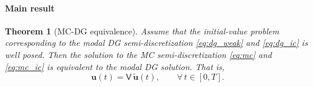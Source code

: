 \documentclass[pdflatex,sn-mathphys-num]{sn-jnl}%
\theoremstyle{thmstyleone}%
\newtheorem{theorem}{Theorem}%
\theoremstyle{thmstyletwo}%
\theoremstyle{thmstylethree}%
\newcommand{\mat}[1]{\ensuremath{\mathsf{#1}}}
\begin{document}
\paragraph{Main result}

\begin{theorem}[MC-DG equivalence]\label{thm:equivalence}
Assume that the initial-value problem corresponding to the modal DG semi-discretization \eqref{eq:dg_weak} and \eqref{eq:dg_ic} is well posed.  Then the solution to the MC semi-discretization \eqref{eq:mc} and \eqref{eq:mc_ic} is equivalent to the modal DG solution.  That is,
\begin{equation*}
    \bm{u}(t) = \mat{V}\, \tilde{\bm{u}}(t), \qquad \forall\, t \in [0,T].
\end{equation*}
\end{theorem}
\end{document}
